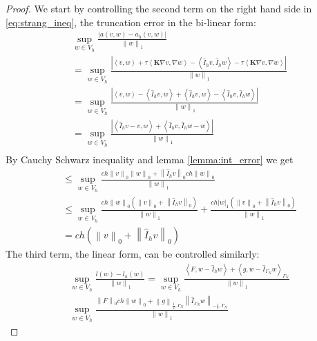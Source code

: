 \documentclass[../Main/main.tex]{subfiles}
\begin{document}
	\begin{proof}
		We start by controlling the second term on the right hand side in \eqref{eq:strang_ineq}, the truncation error in the bi-linear form:
		\begin{equation}
			\begin{gathered}
				\sup_{w\in V_h} \frac{|a(v,w)-a_h(v,w)|}{\left \|w \right \|_1} \\
				=\sup_{w\in V_h} \frac{|\left \langle v,w\right \rangle + \tau \left \langle \pmb{K} \nabla v,\nabla w \right \rangle - \left \langle \hat{I}_h v, \hat{I}_h w \right \rangle - \tau \left \langle \pmb{K} \nabla v, \nabla w \right \rangle|}{\left \| w \right \|_1} \\
				=\sup_{w\in V_h} \frac{|\left \langle v,w\right \rangle - \left \langle \hat{I}_h v, w \right \rangle + \left \langle \hat{I}_h v, w \right \rangle - \left \langle \hat{I}_h v, \hat{I}_h w \right \rangle|}{\left \| w \right \|_1}\\
				= \sup_{w\in V_h}\frac{|\left \langle \hat{I}_h v - v,w \right \rangle + \left \langle \hat{I}_h v, \hat{I}_h w - w \right \rangle |}{\left \| w \right \|_1} \\
			\end{gathered}
		\end{equation}
		By Cauchy Schwarz inequality and lemma \ref{lemma:int_error} we get
		\begin{equation}
			\begin{gathered}
				\leq \sup_{w\in V_h}\frac{ch\left \| v \right \|_0 \left \| w\right \|_0 + \left \|\hat{I}_h v\right \|_0 ch\left \|w\right \|_0}{\left \| w \right \|_1}\\
				\leq \sup_{w\in V_h}\frac{ch\left \|w\right \|_0(\left \|v\right \|_0 + \left \|\hat{I}_h v\right \|_0)}{\left \| w \right \|_1} + \frac{ch |w|_1(\left \|v\right \|_0 + \left \|\hat{I}_h v\right \|_0) }{\left \| w \right \|_1}\\
				=ch(\left \|v\right \|_0 + \left \|\hat{I}_h v\right \|_0)
			\end{gathered}
		\end{equation}
		The third term, the linear form, can be controlled similarly:
		\begin{equation}
			\begin{gathered}
				\sup_{w \in V_h} \frac{l(w)-l_h(w)}{\left \| w \right \|_1} = \sup_{w \in V_h} \frac{\left \langle F,w-\hat{I}_h w \right \rangle + \left \langle g,w-\hat{I}_{\Gamma_N} w \right \rangle_{\Gamma_N}}{\left \| w \right \|_1}\\
				\sup_{w \in V_h} \frac{\left \|F\right \|_0 ch\left \|w\right \|_0 + \left \|g\right \|_{\frac{1}{2},\Gamma_N}\left \|\hat{I}_{\Gamma_N}w\right \|_{-\frac{1}{2},\Gamma_N}}{\left \| w \right \|_1}
			\end{gathered}
		\end{equation}
	\end{proof}
\end{document}
